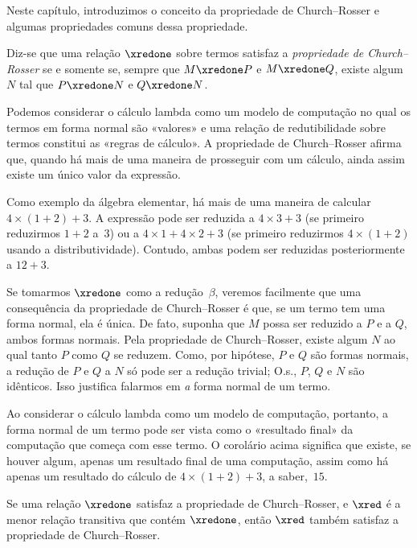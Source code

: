\documentclass[../../../include/open-logic-section]{subfiles}
\begin{document}


Neste capítulo, introduzimos o conceito da propriedade de Church--Rosser e
algumas propriedades comuns dessa propriedade.

\begin{defn} Diz-se que uma relação
  $\xredone$ sobre termos satisfaz a \emph{propriedade de Church--Rosser} se e
  somente se, sempre que $M \xredone P$ e $M \xredone Q$, existe algum~$N$
  tal que $P \xredone N$ e $Q \xredone N$.
\end{defn}

Podemos considerar o cálculo lambda como um modelo de computação no qual os
termos em forma normal são «valores» e uma relação de redutibilidade sobre
termos constitui as «regras de cálculo». A propriedade de Church--Rosser
afirma que, quando há mais de uma maneira de prosseguir com um cálculo, ainda
assim existe um único valor da expressão.

Como exemplo da álgebra elementar, há mais de uma maneira de calcular
$4 \times (1+2) + 3$. A expressão pode ser reduzida a $4 \times 3+3$ (se
primeiro reduzirmos $1+2$ a~$3$) ou a $4 \times 1+4 \times 2+3$ (se primeiro
reduzirmos $4 \times (1+2)$ usando a distributividade). Contudo, ambas podem
ser reduzidas posteriormente a $12+3$.

Se tomarmos $\xredone$ como a redução~$\beta$, veremos facilmente que uma
consequência da propriedade de Church--Rosser é que, se um termo tem uma forma
normal, ela é única. De fato, suponha que $M$ possa ser reduzido a $P$ e a
$Q$, ambos formas normais. Pela propriedade de Church--Rosser, existe algum
$N$ ao qual tanto $P$ como $Q$ se reduzem. Como, por hipótese, $P$ e $Q$ são
formas normais, a redução de $P$ e $Q$ a $N$ só pode ser a redução trivial;
O.s.\@, $P$, $Q$ e $N$ são idênticos. Isso justifica falarmos em \emph{a}
forma normal de um termo.

Ao considerar o cálculo lambda como um modelo de computação, portanto, a
forma normal de um termo pode ser vista como o «resultado final» da computação
que começa com esse termo. O corolário acima significa que existe, se houver
algum, apenas um resultado final de uma computação, assim como há apenas um
resultado do cálculo de $4 \times (1+2)+3$, a saber,~$15$.

\begin{thm} 
  Se uma relação $\xredone$ satisfaz a propriedade de Church--Rosser, e
  $\xred$ é a menor relação transitiva que contém $\xredone$, então $\xred$
  também satisfaz a propriedade de Church--Rosser.
\end{thm}
\end{document}

